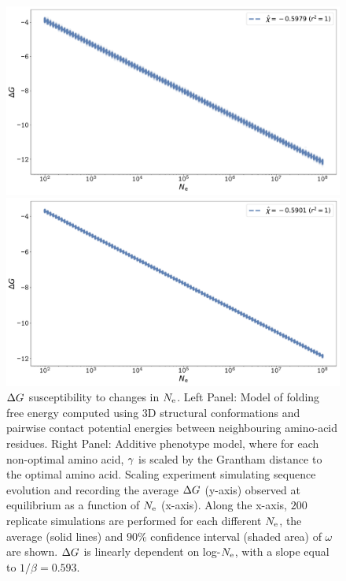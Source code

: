\documentclass{article}
\begin{document}
\begin{figure}[H]
    \centering
    \begin{minipage}{0.49\linewidth}
        \includegraphics[width=\linewidth]{SimuFold-Elasticity-DG.pdf}
    \end{minipage}%
    \hfill
    \begin{minipage}{0.49\linewidth}
        \includegraphics[width=\linewidth]{SimuStab-Elasticity-DG.pdf}
    \end{minipage}
    \caption[$\DeltaG$ susceptibility to changes in $\Ne$]{
    $\DeltaG$ susceptibility to changes in $\Ne$.
    Left Panel: Model of folding free energy computed using 3D structural conformations and pairwise contact potential energies between neighbouring amino-acid residues.
    Right Panel: Additive {phenotype} model, where for each non-optimal amino acid, $\gamma$ is scaled by the Grantham distance to the optimal amino acid.
    Scaling experiment simulating sequence evolution and recording the average $\DeltaG$ (y-axis) observed at equilibrium as a function of $\Ne$ (x-axis).
    Along the x-axis, $200$ replicate simulations are performed for each different $\Ne$, the average (solid lines) and $90\%$ confidence interval (shaded area) of $\omega$ are shown.
    $\DeltaG$ is linearly dependent on log-$\Ne$, with a slope equal to $1/\beta=0.593$.
    }
\end{figure}
\end{document}

